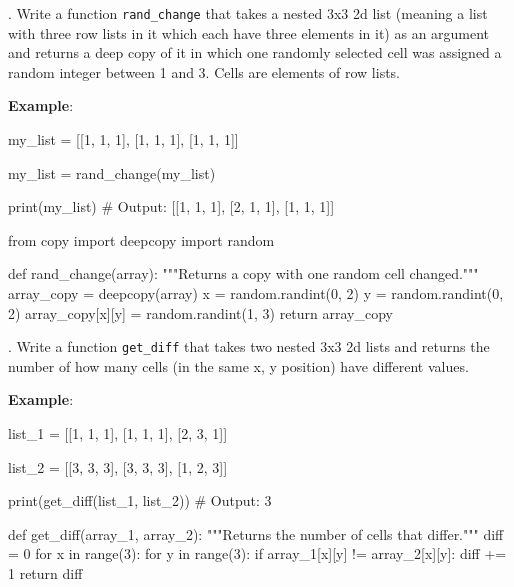 . Write a function \texttt{rand\_change} that takes a nested 3x3 2d list (meaning a list with three row lists in it which each have three elements in it) as an argument and returns a deep copy of it in which one randomly selected cell was assigned a random integer between 1 and 3. Cells are elements of row lists.

\vspace{1em}

\noindent \textbf{Example}:

\begin{pythoncode}

my_list = [[1, 1, 1], [1, 1, 1], [1, 1, 1]]

my_list = rand_change(my_list)

print(my_list)
# Output: [[1, 1, 1], [2, 1, 1], [1, 1, 1]]

\end{pythoncode}

\begin{solution}

\begin{pythoncode}

from copy import deepcopy
import random

def rand_change(array):
    """Returns a copy with one random cell changed."""
    array_copy = deepcopy(array)
    x = random.randint(0, 2)
    y = random.randint(0, 2)
    array_copy[x][y] = random.randint(1, 3)
    return array_copy

\end{pythoncode}

\end{solution}

. Write a function \texttt{get\_diff} that takes two nested 3x3 2d lists and returns the number of how many cells (in the same x, y position) have different values.

\vspace{1em}

\noindent \textbf{Example}:

\begin{pythoncode}

list_1 = [[1, 1, 1], [1, 1, 1], [2, 3, 1]]

list_2 = [[3, 3, 3], [3, 3, 3], [1, 2, 3]]

print(get_diff(list_1, list_2))
# Output: 3

\end{pythoncode}

\begin{solution}

\begin{pythoncode}

def get_diff(array_1, array_2):
    """Returns the number of cells that differ."""
    diff = 0
    for x in range(3):
        for y in range(3):
            if array_1[x][y] != array_2[x][y]:
                diff += 1
    return diff

\end{pythoncode}

\end{solution}

